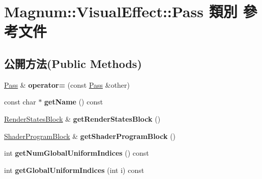 \hypertarget{class_magnum_1_1_visual_effect_1_1_pass}{}\section{Magnum\+:\+:Visual\+Effect\+:\+:Pass 類別 參考文件}
\label{class_magnum_1_1_visual_effect_1_1_pass}
\subsection*{公開方法(Public Methods)}
\begin{DoxyCompactItemize}
\item 
\hyperlink{class_magnum_1_1_visual_effect_1_1_pass}{Pass} \& {\bfseries operator=} (const \hyperlink{class_magnum_1_1_visual_effect_1_1_pass}{Pass} \&other)\hypertarget{class_magnum_1_1_visual_effect_1_1_pass_aa7a8f71a3d10a4293604270791738cc6}{}\label{class_magnum_1_1_visual_effect_1_1_pass_aa7a8f71a3d10a4293604270791738cc6}

\item 
const char $\ast$ {\bfseries get\+Name} () const \hypertarget{class_magnum_1_1_visual_effect_1_1_pass_afa3a5238b16d10c23ccf2a0f8c77d9f0}{}\label{class_magnum_1_1_visual_effect_1_1_pass_afa3a5238b16d10c23ccf2a0f8c77d9f0}

\item 
\hyperlink{class_magnum_1_1_render_states_block}{Render\+States\+Block} \& {\bfseries get\+Render\+States\+Block} ()\hypertarget{class_magnum_1_1_visual_effect_1_1_pass_a9ae58c21336609bc1a6900caa3ab2a2d}{}\label{class_magnum_1_1_visual_effect_1_1_pass_a9ae58c21336609bc1a6900caa3ab2a2d}

\item 
\hyperlink{class_magnum_1_1_shader_program_block}{Shader\+Program\+Block} \& {\bfseries get\+Shader\+Program\+Block} ()\hypertarget{class_magnum_1_1_visual_effect_1_1_pass_a9d51dde6ce54941595f01f33350599f1}{}\label{class_magnum_1_1_visual_effect_1_1_pass_a9d51dde6ce54941595f01f33350599f1}

\item 
int {\bfseries get\+Num\+Global\+Uniform\+Indices} () const \hypertarget{class_magnum_1_1_visual_effect_1_1_pass_a881cc00bd043ca2f233e7a8bb28f3a9f}{}\label{class_magnum_1_1_visual_effect_1_1_pass_a881cc00bd043ca2f233e7a8bb28f3a9f}

\item 
int {\bfseries get\+Global\+Uniform\+Indices} (int i) const \hypertarget{class_magnum_1_1_visual_effect_1_1_pass_a8d4b1b833f1ccaa207d847e506b5bdf3}{}\label{class_magnum_1_1_visual_effect_1_1_pass_a8d4b1b833f1ccaa207d847e506b5bdf3}


\end{DoxyCompactItemize}
